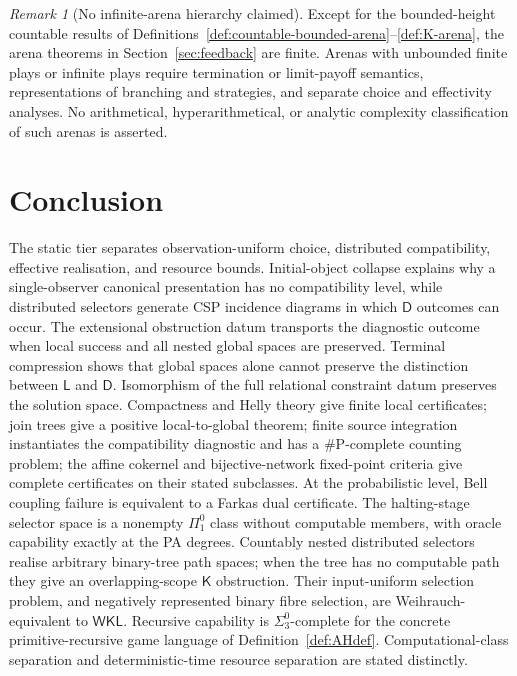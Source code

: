 \documentclass[11pt]{article}
\theoremstyle{plain}
\theoremstyle{definition}
\theoremstyle{remark}
\newtheorem{remark}[theorem]{Remark}
\begin{document}
\begin{remark}[No infinite-arena hierarchy claimed]
Except for the bounded-height countable results of
Definitions~\ref{def:countable-bounded-arena}--\ref{def:K-arena}, the arena
theorems in Section~\ref{sec:feedback} are finite. Arenas with unbounded finite
plays or infinite plays require termination or limit-payoff semantics,
representations of branching and strategies, and separate choice and
effectivity analyses. No arithmetical, hyperarithmetical, or analytic complexity
classification of such arenas is asserted.
\end{remark}







\section{Conclusion}\label{sec:conclusion}

The static tier separates observation-uniform choice, distributed compatibility,
effective realisation, and resource bounds. Initial-object collapse explains
why a single-observer canonical presentation has no compatibility
level, while distributed selectors generate CSP incidence diagrams in which
$\mathsf D$ outcomes can occur.
The extensional obstruction datum transports the diagnostic outcome when local
success and all nested global spaces are preserved. Terminal compression shows
that global spaces alone cannot preserve the distinction between $\mathsf L$
and $\mathsf D$. Isomorphism of the full relational constraint datum preserves
the solution space. Compactness and Helly theory give finite local certificates;
join trees give a positive local-to-global theorem; finite source integration
instantiates the compatibility diagnostic and has a $\#\mathrm P$-complete
counting problem; the affine cokernel and bijective-network fixed-point criteria
give complete certificates on their stated subclasses.
At the probabilistic level, Bell coupling failure is equivalent to a Farkas dual
certificate. The halting-stage selector space is a nonempty $\Pi^0_1$ class
without computable members, with oracle capability exactly at the PA degrees.
Countably nested distributed selectors realise arbitrary binary-tree path spaces;
when the tree has no computable path they give an overlapping-scope
$\mathsf K$ obstruction. Their input-uniform selection problem, and negatively
represented binary fibre selection, are Weihrauch-equivalent to $\mathsf{WKL}$.
Recursive capability is $\Sigma^0_3$-complete for the concrete
primitive-recursive game language of Definition~\ref{def:AHdef}. Computational-class separation and
deterministic-time resource separation are stated distinctly.
\end{document}
